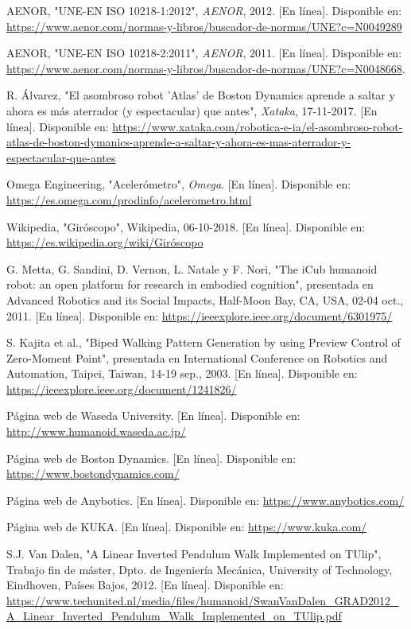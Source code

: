 \begin{thebibliography}{99}
 AENOR, "UNE-EN ISO 10218-1:2012", \textit{AENOR}, 2012. [En línea]. Disponible en: \url{https://www.aenor.com/normas-y-libros/buscador-de-normas/UNE?c=N0049289}

 AENOR, "UNE-EN ISO 10218-2:2011", \textit{AENOR}, 2011. [En línea]. Disponible en: \url{https://www.aenor.com/normas-y-libros/buscador-de-normas/UNE?c=N0048668}.

 R. Álvarez, "El asombroso robot 'Atlas' de Boston Dynamics aprende a saltar y ahora es más aterrador (y espectacular) que antes", \textit{Xataka}, 17-11-2017. [En línea]. Disponible en: \url{https://www.xataka.com/robotica-e-ia/el-asombroso-robot-atlas-de-boston-dymanics-aprende-a-saltar-y-ahora-es-mas-aterrador-y-espectacular-que-antes}

 Omega Engineering, "Acelerómetro", \textit{Omega}. [En línea]. Disponible en: \url{https://es.omega.com/prodinfo/acelerometro.html}

 Wikipedia, "Giróscopo", Wikipedia, 06-10-2018. [En línea]. Disponible en: \url{https://es.wikipedia.org/wiki/Giróscopo}

 G. Metta, G. Sandini, D. Vernon, L. Natale y F. Nori, "The iCub humanoid robot: an open platform for research in embodied cognition", presentada en Advanced Robotics and its Social Impacts, Half-Moon Bay, CA, USA, 02-04 oct., 2011. [En línea]. Disponible en: \url{https://ieeexplore.ieee.org/document/6301975/}

 S. Kajita et al., "Biped Walking Pattern Generation by using Preview Control of Zero-Moment Point", presentada en International Conference on Robotics and Automation, Taipei, Taiwan, 14-19 sep., 2003. [En línea]. Disponible en: \url{https://ieeexplore.ieee.org/document/1241826/}

 Página web de Waseda University. [En línea]. Disponible en: \url{http://www.humanoid.waseda.ac.jp/}

 Página web de Boston Dynamics. [En línea]. Disponible en: \url{https://www.bostondynamics.com/}

 Página web de Anybotics. [En línea]. Disponible en: \url{https://www.anybotics.com/}

 Página web de KUKA. [En línea]. Disponible en: \url{https://www.kuka.com/}

 S.J. Van Dalen, "A Linear Inverted Pendulum Walk Implemented on TUlip", Trabajo fin de máster, Dpto. de Ingeniería Mecánica, University of Technology, Eindhoven, Países Bajos, 2012. [En línea]. Disponible en: \url{https://www.techunited.nl/media/files/humanoid/SwanVanDalen_GRAD2012_A_Linear_Inverted_Pendulum_Walk_Implemented_on_TUlip.pdf}

\end{thebibliography} 
